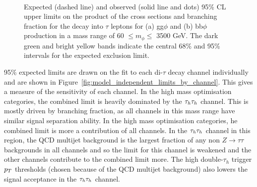 \begin{figure}[!hbtp]
\centering
     \\
\caption{Expected (dashed line) and observed (solid line and dots) 95\% CL upper limits on the product of the cross sections and branching fraction for the decay into $\tau$ leptons for (a) gg$\phi$ and (b) bb$\phi$ production in a mass range of 60 $\leq m_{\phi} \leq$ 3500 GeV.  The dark green and bright yellow bands indicate the central 68\% and 95\% intervals for the expected exclusion limit.}
\label{fig:model_independent_limits}
\end{figure}

95\% expected limits are drawn on the fit to each di-$\tau$ decay channel individually and are shown in Figure~\ref{fig:model_independent_limits_by_channel}.
This gives a measure of the sensitivity of each channel.
In the high mass optimisation categories, the combined limit is heavily dominated by the $\tau_{h}\tau_{h}$ channel.
This is mostly driven by branching fraction, as all channels in this mass range have similar signal separation ability.
In the high mass optimisation categories,  he combined limit is more a contribution of all channels. 
In the $\tau_{h}\tau_{h}$ channel in this region, the QCD multijet background is the largest fraction of any non $Z\rightarrow\tau\tau$ backgrounds in all channels and so the limit for this channel is weakened and the other channels contribute to the combined limit more.
The high double-$\tau_h$ trigger $p_{T}$ thresholds (chosen because of the QCD multijet background) also lowers the signal acceptance in the $\tau_{h}\tau_{h}$ channel. \\

